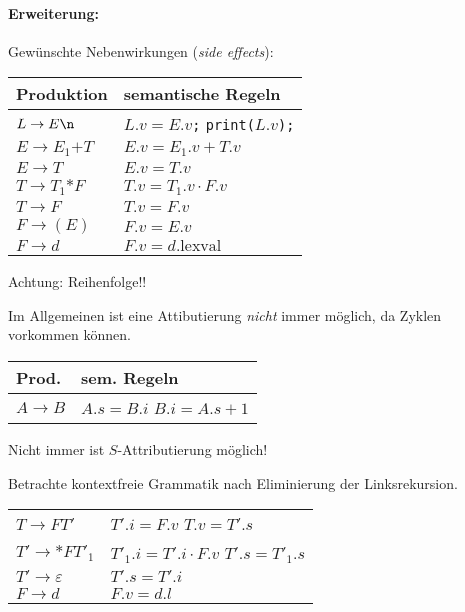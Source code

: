 \paragraph*{Erweiterung:} Gewünschte Nebenwirkungen (\emph{side effects}):
\begin{center}
    \begin{tabular}{l|p{4cm}}
        Produktion             & semantische Regeln      \\\hline
        $L \to E\verb!\n!$     & $L.v = E.v$\texttt{;} \newline \color{red}\verb!print(!$L.v$\verb!);!             \\\hline
        $E \to E_1 \texttt{+} T$&$E.v = E_1.v + T.v$     \\\hline
        $E \to T$              & $E.v = T.v$             \\\hline
        $T \to T_1 \texttt{*} F$&$T.v = T_1.v \cdot F.v$ \\\hline
        $T \to F$              & $T.v = F.v$             \\\hline
        $F \to (E)$            & $F.v = E.v$             \\\hline
        $F \to d$              & $F.v = d.\text{lexval}$
    \end{tabular}
\end{center}
{\large Achtung: Reihenfolge!!}
\par Im Allgemeinen ist eine Attibutierung \emph{nicht} immer möglich, da Zyklen vorkommen können.
\begin{center}
    \begin{tabular}{l|p{3cm}}
        Prod. & sem. Regeln \\\hline
        $A \to B$ & $A.s = B.i$ \newline $B.i = A.s + 1$
    \end{tabular}
    \hspace*{3cm}
\end{center}
Nicht immer ist $S$-Attributierung möglich!
\par Betrachte kontextfreie Grammatik nach Eliminierung der Linksrekursion.
\begin{center}
    \begin{tabular}{l|p{3cm}}
        $T \to FT'$ & $T'.i = F.v$ \newline $T.v = T'.s$ \\
        $T' \to \texttt{*}FT'_1$ & $T'_1.i = T'.i \cdot F.v$ \newline $T'.s = T'_1.s$\\
        $T' \to \varepsilon$ & $T'.s = T'.i$\\
        $F \to d$ & $F.v = d.l$
    \end{tabular}
\end{center}
